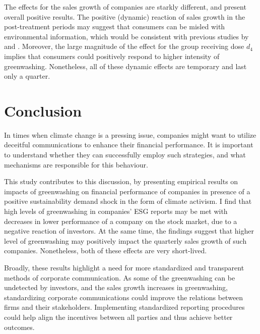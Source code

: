 \documentclass[12pt]{article}
\begin{document}
The effects for the sales growth of companies are starkly different, and present overall positive results. The positive (dynamic) reaction of sales growth in the post-treatment periods may suggest that consumers can be misled with environmental information, which would be consistent with previous studies by \citeauthor{schmuckMisleadingConsumersGreen2018} and \citeauthor{parguelCanEvokingNature2015}. Moreover, the large magnitude of the effect for the group receiving dose $d_4$ implies that consumers could positively respond to higher intensity of greenwashing. Nonetheless, all of these dynamic effects are temporary and last only a quarter.

\newpage
\section{Conclusion}\label{sect:discussion}


In times when climate change is a pressing issue, companies might want to utilize deceitful communications to enhance their financial performance. It is important to understand whether they can successfully employ such strategies, and what mechanisms are responsible for this behaviour. 

This study contributes to this discussion, by presenting empirical results on impacts of greenwashing on financial performance of companies in presence of a positive sustainability demand shock in the form of climate activism. I find that high levels of greenwashing in companies' ESG reports may be met with decreases in lower performance of a company on the stock market, due to a negative reaction of investors. At the same time, the findings suggest that higher level of greenwashing may positively impact the quarterly sales growth of such companies. Nonetheless, both of these effects are very short-lived. 

Broadly, these results highlight a need for more standardized and transparent methods of corporate communication. As some of the greenwashing can be undetected by investors, and the sales growth increases in greenwashing, standardizing corporate communications could improve the relations between firms and their stakeholders. Implementing standardized reporting procedures could help align the incentives between all parties and thus achieve better outcomes. 
\end{document}
